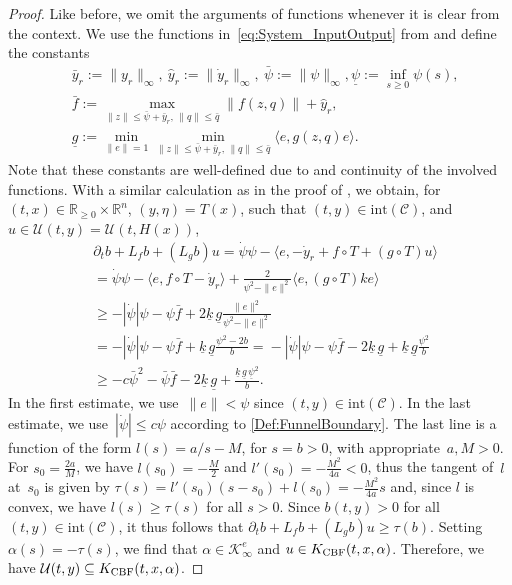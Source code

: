 \documentclass[journal,twoside,web]{ieeeconf}
\newcommand{\R}{\mathbb{R}}
\begin{document}
\begin{proof}
    Like before, we omit the arguments of functions whenever it is clear from the context. We use the functions in~\eqref{eq:System_InputOutput} from  and define the constants
    \begin{align*}
        &\bar y_r := \|y_r\|_\infty, \ \hat y_r := \| \dot y_r\|_\infty, \ \bar \psi := \|\psi\|_\infty, \underline{\psi} := \inf_{s \ge 0} \psi(s),\\
        &\bar f := \max_{ \|z\| \le \bar \psi + \bar y_r, \, \|q\| \le \bar q } \| f(z,q) \| + \hat y_r, \\ 
        & \underline{g} := \min_{\|e\|=1} \min_{ \|z\| \le \bar \psi + \bar y_r, \, \|q\| \le \bar q } \langle e, g(z,q) e \rangle.
    \end{align*}
    Note that these constants are well-defined due to  and continuity of the involved functions.
    With a similar calculation as in the proof of , we obtain, for $(t,x)\in\R_{\ge 0}\times\R^n$, $(y,\eta)=T(x)$, such that $(t,y) \in \mathrm{int}(\mathcal{C})$, and $u\in \mathcal{U}(t,y) = \mathcal{U}(t,H(x))$,
    \begin{equation*}
        \begin{aligned}
            & \partial_t b + L_fb + (L_gb) u 
            = \dot \psi \psi - \langle e, -\dot y_r + f\circ T + (g\circ T) u \rangle \\
             &= \dot \psi \psi - \langle e, f\circ T - \dot y_r \rangle +  \frac{2}{\psi^2 - \|e\|^2} \langle e, (g\circ T) k e \rangle \\
             & \ge -|\dot \psi|\psi - \psi \bar f + 2 \underline{k}\, \underline{g}\frac{\|e\|^2}{\psi^2 - \|e\|^2}  \\
             & = -|\dot \psi|\psi - \psi \bar f + \underline{k}\, \underline{g}\frac{\psi^2 \!-\! 2 b}{b}  
              = \!-|\dot \psi|\psi \!-\! \psi \bar f \!-\! 2 \underline{k}\, \underline{g} + \underline{k}\, \underline{g} \frac{\psi^2 }{b} \\
             & \ge -c \bar \psi^2 - \bar \psi \bar f - 2 \underline{k} \,\underline{g} + \frac{\underline{k}\, \underline{g} \,\underline{\psi}^2}{b} .
        \end{aligned}
    \end{equation*}
    In the first estimate, we use~$\|e\| < \psi$ since $(t,y) \in \textrm{int}(\mathcal{C})$.
    In the last estimate, we use~$|\dot \psi| \le c \psi$ according to \eqref{Def:FunnelBoundary}.
    The last line is a function of the form $l(s) = a/s - M$, for $s=b > 0$, with appropriate~$a,M>0$. 
    For $s_0=\frac{2a}{M}$, we have $l(s_0) = -\frac{M}{2}$ and $l'(s_0) = -\frac{M^2}{4a} < 0$, thus the tangent of~$l$ at~$s_0$ is given by $\tau(s) = l'(s_0) (s-s_0) + l(s_0) = -\frac{M^2}{4a}s$ and, since $l$ is convex, we have $l(s) \ge \tau(s)$ for all $s>0$. Since $b(t,y)>0$ for all $(t,y) \in \textrm{int}(\mathcal{C})$, it thus follows that
    $
        \partial_t b + L_fb + (L_gb) u \ge \tau(b).
    $
    Setting $\alpha(s)= -\tau(s)$, we find that
    $\alpha\in\mathcal{K}_\infty^e$ and $u\in K_{\rm CBF}(t,x,\alpha)$.
    Therefore, we have $\mathcal{U}(t,y) \subseteq K_{\rm CBF}(t,x,\alpha)$. 
\end{proof}
\end{document}
